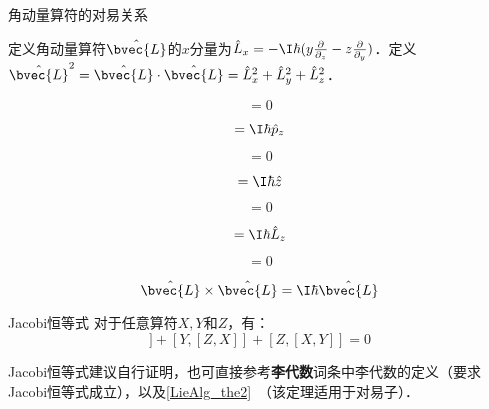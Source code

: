 \begin{theorem}{角动量算符的对易关系}\label{QMPrcp_the6}

定义角动量算符$\hat{\bvec{L}}$的$x$分量为$\hat{L}_x=-\I\hbar(y\frac{\partial}{\partial_z}-z\frac{\partial}{\partial _y})$．定义$\hat{\bvec{L}}^2=\hat{\bvec{L}}\cdot \hat{\bvec{L}}=\hat{L}_x^2+\hat{L}_y^2+\hat{L}_z^2$．

\begin{equation}
[\hat{p}_x, \hat{L}_x]=0
\end{equation}

\begin{equation}
[\hat{p}_x, \hat{L}_y]=\I\hbar\hat{p}_z
\end{equation}

\begin{equation}
[\hat{x}, \hat{L}_x]=0
\end{equation}

\begin{equation}
[\hat{x}, \hat{L}_y]=\I\hbar\hat{z}
\end{equation}

\begin{equation}
[\hat{L}_x, \hat{L}_x]=0
\end{equation}

\begin{equation}
[\hat{L}_x, \hat{L}_y]=\I\hbar\hat{L}_z
\end{equation}

\begin{equation}
[\hat{\bvec{L}}^2, \hat{L}_x]=0
\end{equation}

\begin{equation}
\hat{\bvec{L}}\times\hat{\bvec{L}}=\I\hbar \hat{\bvec{L}}
\end{equation}

\end{theorem}






\begin{theorem}{Jacobi恒等式}
对于任意算符$X, Y$和$Z$，有：
\begin{equation}
[X, [Y, Z]]+[Y, [Z, X]]+[Z, [X, Y]]=0
\end{equation}
\end{theorem}

Jacobi恒等式建议自行证明，也可直接参考\textbf{李代数}词条中李代数的定义（要求Jacobi恒等式成立），以及\autoref{LieAlg_the2}~（该定理适用于对易子）．







